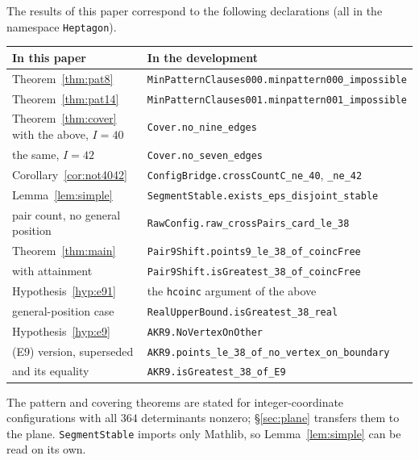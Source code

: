 \documentclass[11pt,a4paper]{article}
\theoremstyle{plain}
\theoremstyle{definition}
\theoremstyle{remark}
\begin{document}
The results of this paper correspond to the following declarations (all in
the namespace \texttt{Heptagon}).

\begin{center}\footnotesize
\begin{tabular}{@{}l@{\quad}l@{}}
\toprule
\textbf{In this paper} & \textbf{In the development} \\
\midrule
Theorem~\ref{thm:pat8}   & \texttt{MinPatternClauses000.minpattern000\_impossible} \\
Theorem~\ref{thm:pat14}  & \texttt{MinPatternClauses001.minpattern001\_impossible} \\
Theorem~\ref{thm:cover} with the above, $I=40$ & \texttt{Cover.no\_nine\_edges} \\
\quad the same, $I=42$   & \texttt{Cover.no\_seven\_edges} \\
Corollary~\ref{cor:not4042} & \texttt{ConfigBridge.crossCountC\_ne\_40}, \texttt{\_ne\_42} \\
Lemma~\ref{lem:simple}   & \texttt{SegmentStable.exists\_eps\_disjoint\_stable} \\
pair count, no general position & \texttt{RawConfig.raw\_crossPairs\_card\_le\_38} \\
Theorem~\ref{thm:main}   & \texttt{Pair9Shift.points9\_le\_38\_of\_coincFree} \\
\quad with attainment    & \texttt{Pair9Shift.isGreatest\_38\_of\_coincFree} \\
Hypothesis~\ref{hyp:e91} & the \texttt{hcoinc} argument of the above \\
general-position case    & \texttt{RealUpperBound.isGreatest\_38\_real} \\
Hypothesis~\ref{hyp:e9}  & \texttt{AKR9.NoVertexOnOther} \\
(E9) version, superseded & \texttt{AKR9.points\_le\_38\_of\_no\_vertex\_on\_boundary} \\
\quad and its equality   & \texttt{AKR9.isGreatest\_38\_of\_E9} \\
\bottomrule
\end{tabular}
\end{center}

\noindent
The pattern and covering theorems are stated for integer-coordinate
configurations with all $364$ determinants nonzero; \S\ref{sec:plane} transfers
them to the plane. \texttt{SegmentStable} imports only Mathlib, so
Lemma~\ref{lem:simple} can be read on its own.
\end{document}
